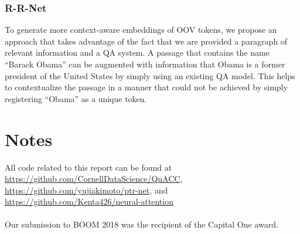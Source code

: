 \documentclass{article}
\begin{document}
\subsubsection{R-R-Net}
To generate more context-aware embeddings of OOV tokens, we propose an approach that takes advantage of the fact that we are provided a paragraph of relevant information and a QA system. A passage that contains the name ``Barack Obama'' can be augmented with information that Obama is a former president of the United States by simply using an existing QA model. This helps to contextualize the passage in a manner that could not be achieved by simply registering ``Obama'' as a unique token.

\section{Notes}
All code related to this report can be found at \url{https://github.com/CornellDataScience/QuACC}, \\
\url{https://github.com/yujiakimoto/ptr-net}, and \url{https://github.com/Kenta426/neural-attention} \\
\\
Our submission to BOOM 2018 was the recipient of the Capital One award.

\newpage


\end{document}
